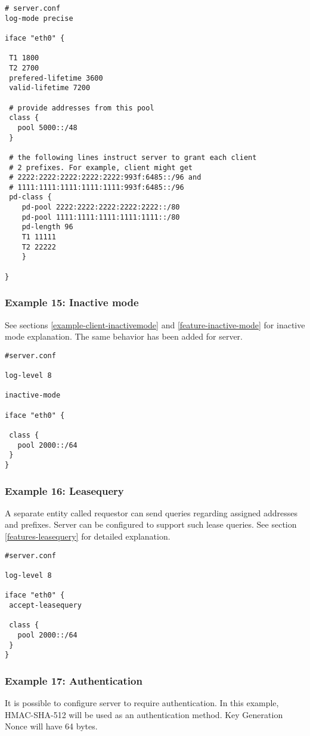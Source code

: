 \begin{lstlisting}
# server.conf
log-mode precise

iface "eth0" {

 T1 1800
 T2 2700
 prefered-lifetime 3600
 valid-lifetime 7200

 # provide addresses from this pool
 class {
   pool 5000::/48
 }

 # the following lines instruct server to grant each client
 # 2 prefixes. For example, client might get
 # 2222:2222:2222:2222:2222:993f:6485::/96 and
 # 1111:1111:1111:1111:1111:993f:6485::/96
 pd-class {
	pd-pool 2222:2222:2222:2222:2222::/80
	pd-pool 1111:1111:1111:1111:1111::/80
	pd-length 96
	T1 11111
	T2 22222
    }

}
\end{lstlisting}

\subsubsection{Example 15: Inactive mode}
\label{example-server-inactivemode}
See sections \ref{example-client-inactivemode} and
\ref{feature-inactive-mode} for inactive mode explanation.
The same behavior has been added for server.

\begin{lstlisting}
#server.conf

log-level 8

inactive-mode

iface "eth0" {

 class {
   pool 2000::/64
 }
}
\end{lstlisting}

\subsubsection{Example 16: Leasequery}
A separate entity
called requestor can send queries regarding assigned addresses and
prefixes. Server can be configured to support such lease queries.
See section \ref{features-leasequery} for detailed explanation.

\begin{lstlisting}
#server.conf

log-level 8

iface "eth0" {
 accept-leasequery

 class {
   pool 2000::/64
 }
}
\end{lstlisting}


\subsubsection{Example 17: Authentication}
\label{example-server-auth}
It is possible to configure server to require authentication. In this
example, HMAC-SHA-512 will be used as an authentication method.
Key Generation Nonce will have 64 bytes.

